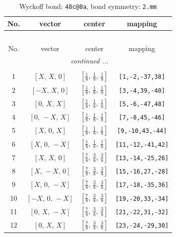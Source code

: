 \documentclass[fleqn,8pt]{jsarticle}
\begin{document}
\begin{longtable}{cccc}
\caption{Wyckoff bond: {\tt 48c@8a}, bond symmetry: {\tt 2.mm}}
 \\
 \hline \hline
No. & vector & center & mapping \\ \hline \endfirsthead

\multicolumn{3}{l}{\tablename\ \thetable{}} \\
 \hline \hline
No. & vector & center & mapping \\ \hline \endhead

 \hline \hline
\multicolumn{3}{r}{\footnotesize\it continued ...} \\ \endfoot

 \hline \hline
\multicolumn{3}{r}{} \\ \endlastfoot

1 & $\left[ X,\, X,\, 0 \right]$ & $\left[ \frac{1}{8},\, \frac{1}{8},\, \frac{1}{8} \right]$ & {\tt [1,-2,-37,38]} \\ \hline
2 & $\left[ - X,\, X,\, 0 \right]$ & $\left[ \frac{1}{8},\, \frac{1}{8},\, \frac{1}{8} \right]$ & {\tt [3,-4,39,-40]} \\ \hline
3 & $\left[ 0,\, X,\, X \right]$ & $\left[ \frac{1}{8},\, \frac{1}{8},\, \frac{1}{8} \right]$ & {\tt [5,-6,-47,48]} \\ \hline
4 & $\left[ 0,\, - X,\, X \right]$ & $\left[ \frac{1}{8},\, \frac{1}{8},\, \frac{1}{8} \right]$ & {\tt [7,-8,45,-46]} \\ \hline
5 & $\left[ X,\, 0,\, X \right]$ & $\left[ \frac{1}{8},\, \frac{1}{8},\, \frac{1}{8} \right]$ & {\tt [9,-10,43,-44]} \\ \hline
6 & $\left[ X,\, 0,\, - X \right]$ & $\left[ \frac{1}{8},\, \frac{1}{8},\, \frac{1}{8} \right]$ & {\tt [11,-12,-41,42]} \\ \hline
7 & $\left[ X,\, X,\, 0 \right]$ & $\left[ \frac{7}{8},\, \frac{3}{8},\, \frac{3}{8} \right]$ & {\tt [13,-14,-25,26]} \\ \hline
8 & $\left[ X,\, - X,\, 0 \right]$ & $\left[ \frac{7}{8},\, \frac{3}{8},\, \frac{3}{8} \right]$ & {\tt [15,-16,27,-28]} \\ \hline
9 & $\left[ X,\, 0,\, - X \right]$ & $\left[ \frac{7}{8},\, \frac{3}{8},\, \frac{3}{8} \right]$ & {\tt [17,-18,-35,36]} \\ \hline
10 & $\left[ - X,\, 0,\, - X \right]$ & $\left[ \frac{7}{8},\, \frac{3}{8},\, \frac{3}{8} \right]$ & {\tt [19,-20,33,-34]} \\ \hline
11 & $\left[ 0,\, X,\, - X \right]$ & $\left[ \frac{7}{8},\, \frac{3}{8},\, \frac{3}{8} \right]$ & {\tt [21,-22,31,-32]} \\ \hline
12 & $\left[ 0,\, X,\, X \right]$ & $\left[ \frac{7}{8},\, \frac{3}{8},\, \frac{3}{8} \right]$ & {\tt [23,-24,-29,30]} \\
\end{longtable}
\end{document}
